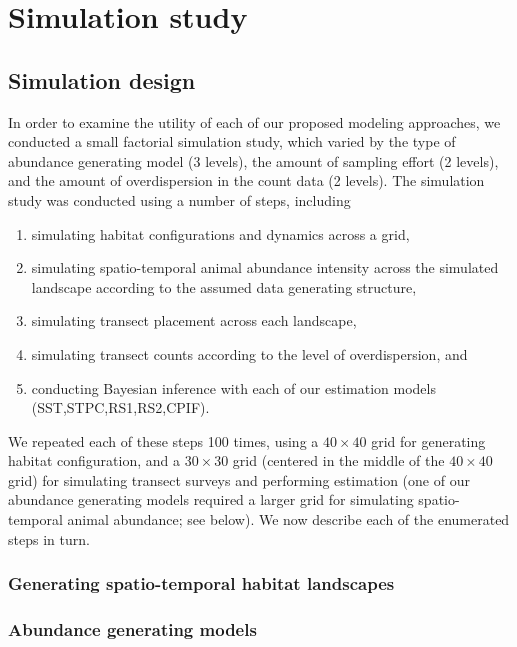 \documentclass[times,mee,doublespace,]{besauth2}
\begin{document}
\section{Simulation study}

\subsection{Simulation design}

In order to examine the utility of each of our proposed modeling approaches, we conducted a small factorial simulation study, which varied by the type of abundance generating model (3 levels), the amount of sampling effort (2 levels), and the amount of overdispersion in the count data (2 levels).  The simulation study was conducted using a number of steps, including
\begin{enumerate}
 \item simulating habitat configurations and dynamics across a grid,
 \item simulating spatio-temporal animal abundance intensity across the simulated landscape according to the assumed data generating structure,
 \item simulating transect placement across each landscape,
 \item simulating transect counts according to the level of overdispersion, and
 \item conducting Bayesian inference with each of our estimation models (SST,STPC,RS1,RS2,CPIF).
\end{enumerate}
We repeated each of these steps 100 times, using a $40 \times 40$ grid for generating habitat configuration, and
a $30 \times 30$ grid (centered in the middle of the $40 \times 40$ grid) for simulating transect surveys and performing estimation (one of our abundance generating models required a larger grid for simulating spatio-temporal animal abundance; see below).  We now describe each of the enumerated steps in turn.

\subsubsection{Generating spatio-temporal habitat landscapes}



\subsubsection{Abundance generating models}
\end{document}
